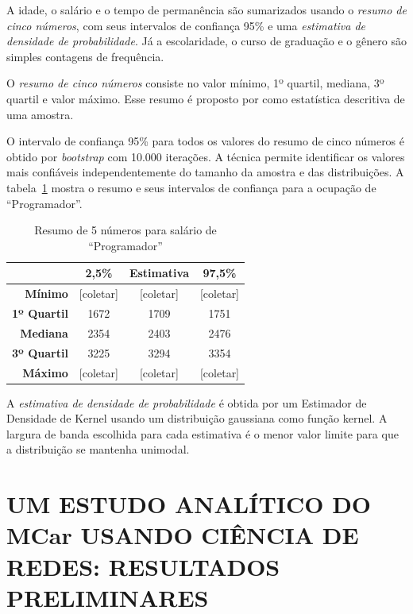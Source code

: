 \documentclass[12pt,a4paper,final]{article}
\begin{document}
A idade, o salário e o tempo de permanência são sumarizados usando o \textit{resumo de cinco números}, com seus intervalos de confiança 95\% e uma \textit{estimativa de densidade de probabilidade}. Já a escolaridade, o curso de graduação e o gênero são simples contagens de frequência.

O \textit{resumo de cinco números} consiste no valor mínimo, 1º quartil, mediana, 3º quartil e valor máximo. Esse resumo é proposto por  como estatística descritiva de uma amostra.

O intervalo de confiança 95\% para todos os valores do resumo de cinco números é obtido por \textit{bootstrap} com 10.000 iterações. A técnica permite identificar os valores mais confiáveis independentemente do tamanho da amostra e das distribuições. A tabela~\ref{tab:resumo-salario-programador} mostra o resumo e seus intervalos de confiança para a ocupação de \enquote{Programador}.

\begin{table}[htb]
\centering
\begin{tabular}{r|c|c|c}
                    & \textbf{2,5\%} & \textbf{Estimativa} & \textbf{97,5\%} \\ \hline
\textbf{Mínimo}     & [coletar]      & [coletar]           & [coletar] \\ \hline
\textbf{1º Quartil} & 1672           & 1709                & 1751 \\ \hline
\textbf{Mediana}    & 2354           & 2403                & 2476 \\ \hline
\textbf{3º Quartil} & 3225           & 3294                & 3354 \\ \hline
\textbf{Máximo}     & [coletar]      & [coletar]           & [coletar]    
\end{tabular}
\caption{Resumo de 5 números para salário de \enquote{Programador}}
\label{tab:resumo-salario-programador}
\end{table}

A \textit{estimativa de densidade de probabilidade} é obtida por um Estimador de Densidade de Kernel usando um distribuição gaussiana como função kernel. A largura de banda escolhida para cada estimativa é o menor valor limite para que a distribuição se mantenha unimodal.

\section{UM ESTUDO ANALÍTICO DO MCar USANDO CIÊNCIA DE REDES: RESULTADOS PRELIMINARES}
\end{document}
